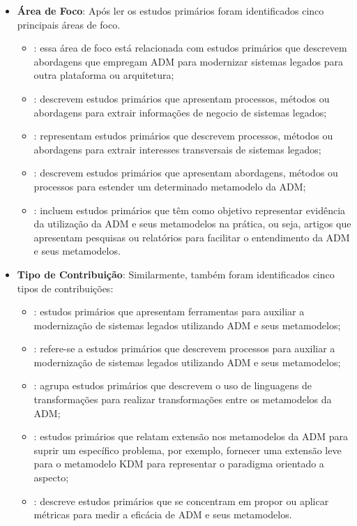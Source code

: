 \begin{itemize}
\item \textbf{Área de Foco}: Após ler os estudos primários foram identificados cinco principais áreas de foco. 
    
    \begin{itemize}
        \item {}: essa área de foco está relacionada com estudos primários que descrevem abordagens que empregam ADM para modernizar sistemas legados para outra plataforma ou arquitetura;
        \item {}: descrevem estudos primários que apresentam processos, métodos ou abordagens para extrair informações de negocio de sistemas legados;
        \item {}: representam estudos primários que descrevem processos, métodos ou abordagens para extrair interesses transversais de sistemas legados;
        \item {}: descrevem estudos primários que apresentam abordagens, métodos ou processos para estender um determinado metamodelo da ADM;
        \item {}: incluem estudos primários que têm como objetivo representar evidência da utilização da ADM e seus metamodelos na prática, ou seja, artigos que apresentam pesquisas ou relatórios para facilitar o entendimento da ADM e seus metamodelos.
    \end{itemize}
    
    \item \textbf{Tipo de Contribuição}: Similarmente, também foram identificados cinco tipos de contribuições:
        
        \begin{itemize}
            \item {}: estudos primários que apresentam ferramentas para auxiliar a modernização de sistemas legados utilizando ADM e seus metamodelos;
            \item {}: refere-se a estudos primários que descrevem processos para auxiliar a modernização de sistemas legados utilizando ADM e seus metamodelos;
            \item {}: agrupa estudos primários que descrevem o uso de linguagens de transformações para realizar transformações entre os metamodelos da ADM;
            \item {}: estudos primários que relatam extensão nos metamodelos da ADM para suprir um específico problema, por exemplo, fornecer uma extensão leve para o metamodelo KDM para representar o paradigma orientado a aspecto;
            \item {}: descreve estudos primários que se concentram em propor ou aplicar métricas para medir a eficácia de ADM e seus metamodelos.
        \end{itemize}
        

\end{itemize}
